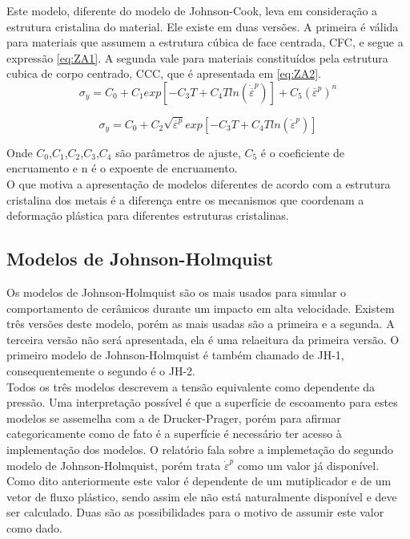  Este modelo, diferente do modelo de Johnson-Cook, leva em consideração a estrutura cristalina do material. Ele existe em duas versões. A primeira é válida para materiais que assumem a estrutura cúbica de face centrada, CFC, e segue a expressão \ref{eq:ZA1}. A segunda vale para materiais constituídos pela estrutura cubica de corpo centrado, CCC, que é apresentada em \ref{eq:ZA2}. \\
 
 \begin{equation} \label{eq:ZA1}
     \sigma_y = C_0 + C_1 exp[-C_3T + C_4Tln(\dot{\overline{\varepsilon}}^p)] + C_5 (\overline{\varepsilon}^p)^n
 \end{equation}
 
  \begin{equation} \label{eq:ZA2}
     \sigma_y = C_0 + C_2\sqrt{\overline{\varepsilon}^p}exp[-C_3T + C_4Tln(\dot{\varepsilon}^p)] 
 \end{equation}
 
Onde $C_0$,$C_1$,$C_2$,$C_3$,$C_4$ são parâmetros de ajuste, $ C_5 $ é o coeficiente de encruamento e n é o expoente de encruamento. \\

O que motiva a apresentação de modelos diferentes de acordo com a estrutura cristalina dos metais é a diferença entre os mecanismos que coordenam a deformação plástica para diferentes estruturas cristalinas.
 
 \subsection{Modelos de Johnson-Holmquist}
 
 Os modelos de Johnson-Holmquist são os mais usados para simular o comportamento de cerâmicos durante um impacto em alta velocidade. Existem três versões deste modelo, porém as mais usadas são a primeira e a segunda. A terceira versão não será apresentada, ela é uma relaeitura da primeira versão. O primeiro modelo de Johnson-Holmquist é também chamado de JH-1, consequentemente o segundo é o JH-2.  \\
 
 Todos os três modelos descrevem a tensão equivalente como dependente da pressão. Uma interpretação possível é que a superfície de escoamento para estes modelos se assemelha com a de Drucker-Prager, porém para afirmar categoricamente como de fato é a superfície é necessário ter acesso à implementação dos modelos. O relatório \cite{JH2Imp} fala sobre a implemetação do segundo modelo de Johnson-Holmquist,
 porém trata $ \dot{\varepsilon}^p $ como um valor já disponível. Como dito anteriormente este valor é dependente de um mutiplicador e de um vetor de fluxo plástico, sendo assim ele não está naturalmente disponível e deve ser calculado. Duas são as possibilidades para o motivo de assumir este valor como dado. \\
 
